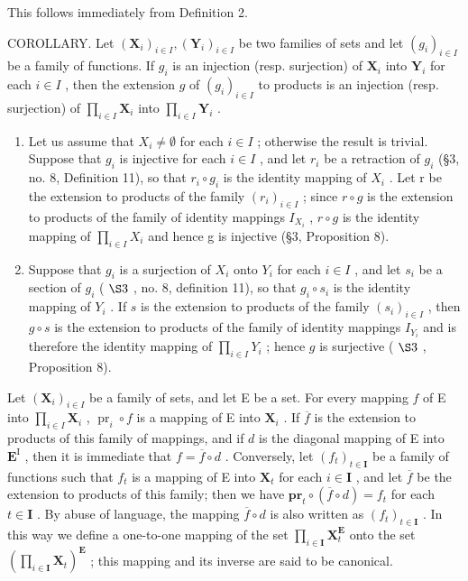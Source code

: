 This follows immediately from Definition 2.

COROLLARY. Let \((\mathbf{X}_i)_{i\in I}, (\mathbf{Y}_i)_{i\in I}\) be two families of sets and let \((g_i)_{i\in I}\) be a family of functions. If \(g_i\) is an injection (resp. surjection) of \(\mathbf{X}_i\) into \(\mathbf{Y}_i\) for each \(i\in I\) , then the extension \(g\) of \((g_i)_{i\in I}\) to products is an injection (resp. surjection) of \(\prod_{i\in I} \mathbf{X}_i\) into \(\prod_{i\in I} \mathbf{Y}_i\) .

\begin{enumerate}
\def\labelenumi{(\arabic{enumi})}
\item
  Let us assume that \(X_{i} \neq \emptyset\) for each \(i \in I\) ; otherwise the result is trivial. Suppose that \(g_{i}\) is injective for each \(i \in I\) , and let \(r_{i}\) be a retraction of \(g_{i}\) (§3, no. 8, Definition 11), so that \(r_{i} \circ g_{i}\) is the identity mapping of \(X_{i}\) . Let r be the extension to products of the family \((r_{i})_{i \in I}\) ; since \(r \circ g\) is the extension to products of the family of identity mappings \(I_{X_{i}}\) , \(r \circ g\) is the identity mapping of \(\prod_{i \in I} X_{i}\) and hence g is injective (§3, Proposition 8).
\item
  Suppose that \(g_{i}\) is a surjection of \(X_{i}\) onto \(Y_{i}\) for each \(i \in I\) , and let \(s_{i}\) be a section of \(g_{i}\) ( \(\S 3\) , no. 8, definition 11), so that \(g_{i} \circ s_{i}\) is the identity mapping of \(Y_{i}\) . If \(s\) is the extension to products of the family \((s_{i})_{i \in I}\) , then \(g \circ s\) is the extension to products of the family of identity mappings \(I_{Y_{i}}\) and is therefore the identity mapping of \(\prod_{i \in I} Y_{i}\) ; hence \(g\) is surjective ( \(\S 3\) , Proposition 8).
\end{enumerate}

Let \((\mathbf{X}_i)_{i\in I}\) be a family of sets, and let E be a set. For every mapping \(f\) of E into \(\prod_{i\in I} \mathbf{X}_i\) , \(\operatorname{pr}_i \circ f\) is a mapping of E into \(\mathbf{X}_i\) . If \(\overline{f}\) is the extension to products of this family of mappings, and if \(d\) is the diagonal mapping of E into \(\mathbf{E}^{\mathrm{I}}\) , then it is immediate that \(f = \overline{f} \circ d\) . Conversely, let \((f_{t})_{t \in \mathbf{I}}\) be a family of functions such that \(f_{t}\) is a mapping of E into \(\mathbf{X}_{t}\) for each \(i \in \mathbf{I}\) , and let \(\overline{f}\) be the extension to products of this family; then we have \(\mathbf{pr}_{t} \circ (\overline{f} \circ d) = f_{t}\) for each \(t \in \mathbf{I}\) . By abuse of language, the mapping \(\overline{f} \circ d\) is also written as \((f_{t})_{t \in \mathbf{I}}\) . In this way we define a one-to-one mapping of the set \(\prod_{i \in \mathbf{I}} \mathbf{X}_{t}^{\mathbf{E}}\) onto the set \(\left(\prod_{i \in \mathbf{I}} \mathbf{X}_{t}\right)^{\mathbf{E}}\) ; this mapping and its inverse are said to be canonical.

